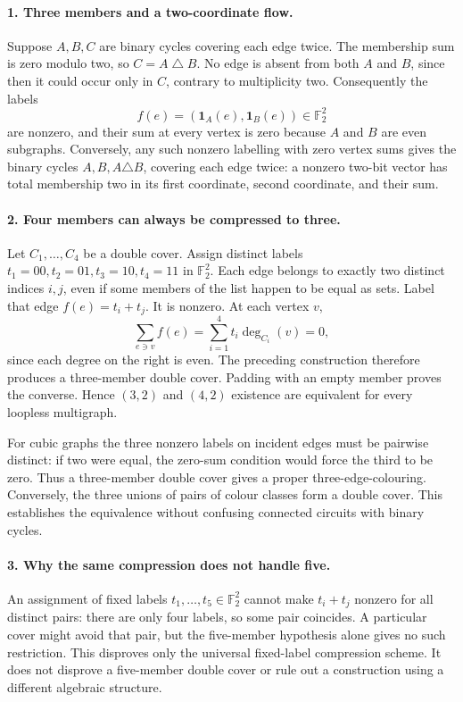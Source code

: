 \documentclass[11pt,a4paper]{article}
\begin{document}
\paragraph{1. Three members and a two-coordinate flow.}
Suppose $A,B,C$ are binary cycles covering each edge twice. The
membership sum is zero modulo two, so $C=A\mathbin{\triangle}B$.
No edge is absent from both $A$ and $B$, since then it could occur
only in $C$, contrary to multiplicity two. Consequently the labels
\[
 f(e)=(\mathbf1_A(e),\mathbf1_B(e))\in\mathbb F_2^2
\]
are nonzero, and their sum at every vertex is zero because $A$ and
$B$ are even subgraphs. Conversely, any such nonzero labelling with
zero vertex sums gives the binary cycles $A,B,A\triangle B$, covering
each edge twice: a nonzero two-bit vector has total membership two
in its first coordinate, second coordinate, and their sum.

\paragraph{2. Four members can always be compressed to three.}
Let $C_1,\ldots,C_4$ be a double cover. Assign distinct labels
$t_1=00,t_2=01,t_3=10,t_4=11$ in $\mathbb F_2^2$. Each edge belongs
to exactly two distinct indices $i,j$, even if some members of the
list happen to be equal as sets. Label that edge $f(e)=t_i+t_j$.
It is nonzero. At each vertex $v$,
\[
 \sum_{e\ni v}f(e)=\sum_{i=1}^4 t_i\deg_{C_i}(v)=0,
\]
since each degree on the right is even. The preceding construction
therefore produces a three-member double cover. Padding with an empty
member proves the converse. Hence $(3,2)$ and $(4,2)$ existence are
equivalent for every loopless multigraph.

For cubic graphs the three nonzero labels on incident edges must be
pairwise distinct: if two were equal, the zero-sum condition would
force the third to be zero. Thus a three-member double cover gives
a proper three-edge-colouring. Conversely, the three unions of pairs
of colour classes form a double cover. This establishes the equivalence
without confusing connected circuits with binary cycles.

\paragraph{3. Why the same compression does not handle five.}
An assignment of fixed labels $t_1,\ldots,t_5\in\mathbb F_2^2$ cannot
make $t_i+t_j$ nonzero for all distinct pairs: there are only four
labels, so some pair coincides. A particular cover might avoid that
pair, but the five-member hypothesis alone gives no such restriction.
This disproves only the universal fixed-label compression scheme. It
does not disprove a five-member double cover or rule out a construction
using a different algebraic structure.
\end{document}

